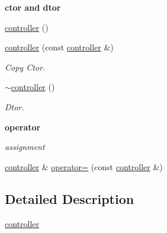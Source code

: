 \begin{Indent}{\bf ctor and dtor}\par
{\em \label{_amgrp98fbd3e5ae66fcd014fb744fec76c58d}
 }\begin{DoxyCompactItemize}
\item 
\hyperlink{classnebula_1_1content_1_1actor_1_1renderer_1_1controller_a3e96d8f9809fe0ec0808f413564bb666}{controller} ()
\item 
\hyperlink{classnebula_1_1content_1_1actor_1_1renderer_1_1controller_ac1b790deb457fcaa7fb0ac2707152618}{controller} (const \hyperlink{classnebula_1_1content_1_1actor_1_1renderer_1_1controller}{controller} \&)
\begin{DoxyCompactList}\small\item\em Copy Ctor. \item\end{DoxyCompactList}\item 
\hyperlink{classnebula_1_1content_1_1actor_1_1renderer_1_1controller_a760c5888c756e79b887c5e301c22caad}{$\sim$controller} ()
\begin{DoxyCompactList}\small\item\em Dtor. \item\end{DoxyCompactList}\end{DoxyCompactItemize}
\end{Indent}
\begin{Indent}{\bf operator}\par
{\em \label{_amgrp4b583376b2767b923c3e1da60d10de59}
 assignment }\begin{DoxyCompactItemize}
\item 
\hyperlink{classnebula_1_1content_1_1actor_1_1renderer_1_1controller}{controller} \& \hyperlink{classnebula_1_1content_1_1actor_1_1renderer_1_1controller_ac8f4e2e48a0a0652e469313b798bfac8}{operator=} (const \hyperlink{classnebula_1_1content_1_1actor_1_1renderer_1_1controller}{controller} \&)
\end{DoxyCompactItemize}
\end{Indent}


\subsection{Detailed Description}
\hyperlink{classnebula_1_1content_1_1actor_1_1renderer_1_1controller}{controller} 

